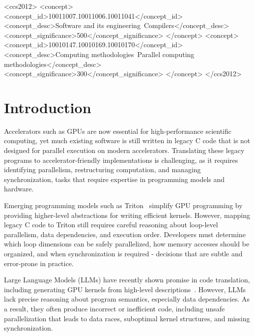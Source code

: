 \documentclass[sigconf]{acmart}
\begin{document}
\begin{CCSXML}
<ccs2012>
  <concept>
    <concept_id>10011007.10011006.10011041</concept_id>
    <concept_desc>Software and its engineering~Compilers</concept_desc>
    <concept_significance>500</concept_significance>
  </concept>
  <concept>
    <concept_id>10010147.10010169.10010170</concept_id>
    <concept_desc>Computing methodologies~Parallel computing methodologies</concept_desc>
    <concept_significance>300</concept_significance>
  </concept>
</ccs2012>
\end{CCSXML}



\maketitle

\section{Introduction}
\label{sec:intro}

Accelerators such as GPUs are now essential for high-performance scientific computing, yet much existing software is still written in legacy C code that is not designed for parallel execution on modern accelerators. Translating these legacy programs to accelerator-friendly implementations is challenging, as it requires identifying parallelism, restructuring computation, and managing synchronization, tasks that require expertise in programming models and hardware.


Emerging programming models such as Triton~\cite{tillet2019triton} simplify GPU programming by providing higher-level abstractions for writing efficient kernels. However, mapping legacy C code to Triton still requires careful reasoning about loop-level parallelism, data dependencies, and execution order. Developers must determine which loop dimensions can be safely parallelized, how memory accesses should be organized, and when synchronization is required - decisions that are subtle and error-prone in practice.


Large Language Models (LLMs) have recently shown promise in code translation, including generating GPU kernels from high-level descriptions~\cite{chen2024chatgpt, ouyang2024kernelbench}. However, LLMs lack precise reasoning about program semantics, especially data dependencies. As a result, they often produce incorrect or inefficient code, including unsafe parallelization that leads to data races, suboptimal kernel structures, and missing synchronization.
\end{document}

